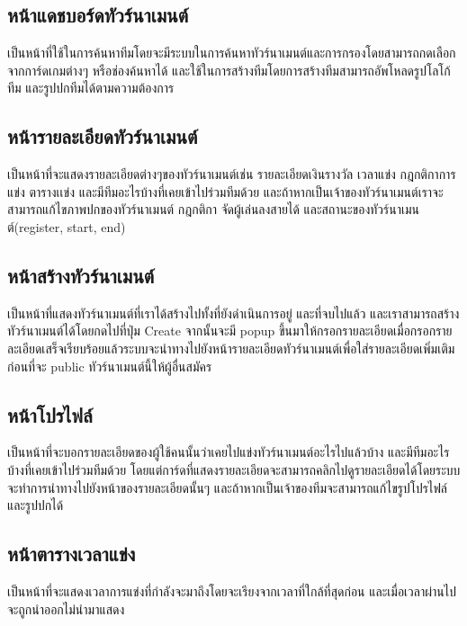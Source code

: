 \subsection{หน้าแดชบอร์ดทัวร์นาเมนต์}
เป็นหน้าที่ใช้ในการค้นหาทีมโดยจะมีระบบในการค้นหาทัวร์นาเมนต์และการกรองโดยสามารถกดเลือกจากการ์ดเกมต่างๆ หรือช่องค้นหาได้ และใช้ในการสร้างทีมโดยการสร้างทีมสามารถอัพโหลดรูปโลโก้ทีม และรูปปกทีมได้ตามความต้องการ
\subsection{หน้ารายละเอียดทัวร์นาเมนต์}
เป็นหน้าที่จะแสดงรายละเอียดต่างๆของทัวร์นาเมนต์เช่น รายละเอียดเงินรางวัล เวลาแข่ง กฎกติกาการแข่ง ตารางเเข่ง และมีทีมอะไรบ้างที่เคยเข้าไปร่วมทีมด้วย
และถ้าหากเป็นเจ้าของทัวร์นาเมนต์เราจะสามารถแก้ไขภาพปกของทัวร์นาเมนต์ กฎกติกา จัดผู้เล่นลงสายได้ และสถานะของทัวร์นาเมนต์(register, start, end)
\subsection{หน้าสร้างทัวร์นาเมนต์}
เป็นหน้าที่แสดงทัวร์นาเมนต์ที่เราได้สร้างไปทั้งที่ยังดำเนินการอยู่ และที่จบไปแล้ว และเราสามารถสร้างทัวร์นาเมนต์ได้โดยกดไปที่ปุ่ม Create จากนั้นจะมี popup ขึ้นมาให้กรอกรายละเอียดเมื่อกรอกรายละเอียดเสร็จเรียบร้อยแล้วระบบจะนำทางไปยังหน้ารายละเอียดทัวร์นาเมนต์เพื่อใส่รายละเอียดเพิ่มเติมก่อนที่จะ public ทัวร์นาเมนต์นี้ให้ผู้อื่นสมัคร
\subsection{หน้าโปรไฟล์}
เป็นหน้าที่จะบอกรายละเอียดของผู้ใช้คนนั้นว่าเคยไปแข่งทัวร์นาเมนต์อะไรไปแล้วบ้าง และมีทีมอะไรบ้างที่เคยเข้าไปร่วมทีมด้วย โดยแต่การ์ดที่แสดงรายละเอียดจะสามารถคลิกไปดูรายละเอียดได้โดยระบบจะทำการนำทางไปยังหน้าของรายละเอียดนั้นๆ
และถ้าหากเป็นเจ้าของทีมจะสามารถแก้ไขรูปโปรไฟล์ และรูปปกได้
\subsection{หน้าตารางเวลาแข่ง}
เป็นหน้าที่จะแสดงเวลาการแข่งที่กำลังจะมาถึงโดยจะเรียงจากเวลาที่ใกล้ที่สุดก่อน และเมื่อเวลาผ่านไปจะถูกนำออกไม่นำมาแสดง


